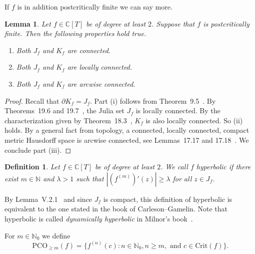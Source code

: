 \documentclass[12pt,oneside,a4]{amsart}
\newcommand{\IC}{\mathbb{C}}
\newcommand{\IN}{\mathbb{N}}
\newcounter{maincounter}
\numberwithin{maincounter}{section}
\numberwithin{equation}{section}
\newtheorem{lemma}[maincounter]{Lemma}
\newtheorem{defi}[maincounter]{Definition}
\newcommand{\pco}{\mathrm{PCO}}
\begin{document}
If $f$ is in addition postcritically finite we can say more. 
\begin{lemma}
  \label{lem:postcriticalprops}
  Let $f\in\IC[T]$ be of degree at least $2$. Suppose that $f$ is
  postcritically finite. Then the following properties hold true.
  \begin{enumerate}
  \item [(i)] Both $J_f$ and $K_f$ are connected.
  \item[(ii)] Both  $J_f$ and $K_f$ are locally connected.
  \item[(iii)] Both  $J_f$ and $K_f$ are arcwise connected.
  \end{enumerate}
\end{lemma}
\begin{proof}
  Recall that $\partial K_f = J_f$. Part (i) follows from
  Theorem~9.5~\cite{Milnor}. By Theorems~19.6 and 19.7~\cite{Milnor}, the
  Julia set $J_f$ is locally connected. By the characterization given by
  Theorem~18.3~\cite{Milnor}, $K_f$ is also locally connected.  So (ii) holds.
  By a general fact from topology, a connected, locally
  connected,  compact metric Hausdorff space is arcwise connected, see
  Lemmas~17.17 and 17.18~\cite{Milnor}. We conclude part (iii).
\end{proof}



\begin{defi}
  \label{def:hyperbolic}
  Let $f\in\IC[T]$ be of degree at least $2$. We call $f$ hyperbolic
  if there exist $m\in\IN$ and $\lambda >1$ such that
  $|(f^{(m)})'(z)|\ge\lambda$ for all $z\in J_f$. 
\end{defi}

By Lemma~V.2.1~\cite{CarlesonGamelin} and since $J_f$ is compact, this
definition of hyperbolic is equivalent to the one stated in the book
of Carleson--Gamelin.
Note that hyperbolic is called \textit{dynamically hyperbolic} in Milnor's
book~\cite{Milnor}.

For $m\in\IN_0$ we define
\begin{equation}
  \label{def:pcom}
  \pco_{\ge m}(f) = \{f^{(n)}(c) : n\in\IN_0, n\ge m, \text{ and
  }c\in\mathrm{Crit}(f)\}. 
\end{equation}
\end{document}
